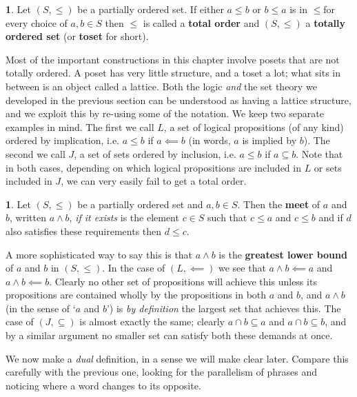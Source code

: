 \documentclass[oneside,english]{amsbook}
\numberwithin{section}{chapter}
\theoremstyle{plain}
\theoremstyle{definition}
\newtheorem{defn}[thm]{\protect\definitionname}
\providecommand{\definitionname}{Definition}
\begin{document}
\begin{defn} 
	Let $(S,\le)$ be a partially ordered set. If either $a\le b$ or $b\le a$ is in $\le$for every choice of $a,b\in S$ then $\le$ is called a \textbf{total order} and $(S,\le)$ a \textbf{totally ordered set }(or \textbf{toset }for short). 
\end{defn} 

Most of the important constructions in this chapter involve posets that are not totally ordered. A poset has very little structure, and a toset a lot; what sits in between is an object called a lattice. Both the logic \emph{and }the set theory we developed in the previous section can be understood as having a lattice structure, and we exploit this by re-using some of the notation. We keep two separate examples in mind. The first we call $L$, a set of logical propositions (of any kind) ordered by implication, i.e. $a\le b$ if $a\impliedby b$ (in words, $a$ is implied by $b$). The second we call $J$, a set of sets ordered by inclusion, i.e. $a\le b$ if $a\subseteq b$. Note that in both cases, depending on which logical propositions are included in $L$ or sets included in $J$, we can very easily fail to get a total order. 

\begin{defn} 
	Let $(S,\le)$ be a partially ordered set and $a,b\in S$. Then the \textbf{meet} of $a$ and $b$, written $a\land b$, \emph{if it exists} is the element $c\in S$ such that $c\le a$ and $c\le b$ and if $d$ also satisfies these requirements then $d\le c$. 
\end{defn}
 
A more sophisticated way to say this is that $a\land b$ is the \textbf{greatest lower bound }of $a$ and $b$ in $(S,\le)$. In the case of $(L,\impliedby)$ we see that $a\land b\impliedby a$ and $a\land b\impliedby b$. Clearly no other set of propositions will achieve this unless its propositions are contained wholly by the propositions in both $a$ and $b$, and $a\land b$ (in the sense of `$a$ and $b$') is \emph{by definition} the largest set that achieves this. The case of $(J,\subseteq)$ is almost exactly the same; clearly $a\cap b\subseteq a$ and $a\cap b\subseteq b$, and by a similar argument no smaller set can satisfy both these demands at once.

We now make a \emph{dual }definition, in a sense we will make clear later. Compare this carefully with the previous one, looking for the parallelism of phrases and noticing where a word changes to its opposite. 
\end{document}
